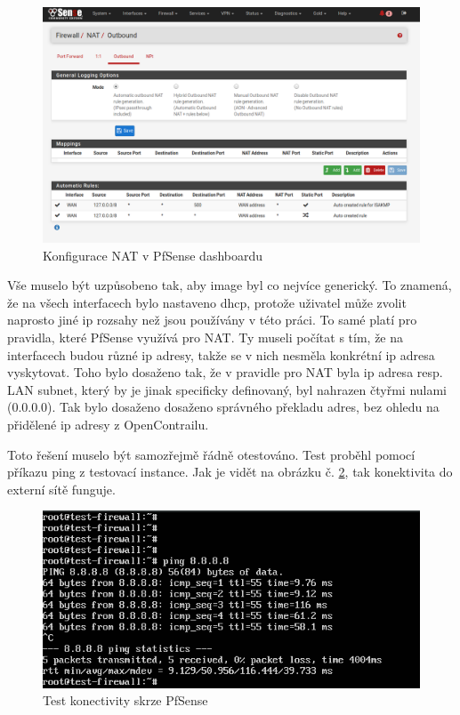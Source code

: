 \begin{figure}[h]
\begin{centering}
\includegraphics[scale=0.38]{images/nat}
\par\end{centering}
\caption{Konfigurace NAT v PfSense dashboardu\label{fig:nat}}
\end{figure}

Vše muselo být uzpůsobeno tak, aby image byl co nejvíce generický. To znamená, že na všech interfacech bylo nastaveno dhcp, protože uživatel může zvolit naprosto jiné ip rozsahy než jsou používány v této práci. To samé platí pro pravidla, které PfSense využívá pro NAT. Ty museli počítat s tím, že na interfacech budou různé ip adresy, takže se v nich nesměla konkrétní ip adresa vyskytovat. Toho bylo dosaženo tak, že v pravidle pro NAT byla ip adresa resp. LAN subnet, který by je jinak specificky definovaný, byl nahrazen čtyřmi nulami (0.0.0.0). Tak bylo dosaženo dosaženo správného překladu adres, bez ohledu na přidělené ip adresy z OpenContrailu.

Toto řešení muselo být samozřejmě řádně otestováno. Test proběhl pomocí příkazu ping z testovací instance. Jak je vidět na obrázku č. \ref{fig:test_pfsense}, tak konektivita do externí sítě funguje.

\begin{figure}[h]
\begin{centering}
\includegraphics[scale=0.5]{images/test_pfsense}
\par\end{centering}
\caption{Test konectivity skrze PfSense\label{fig:test_pfsense}}
\end{figure}


